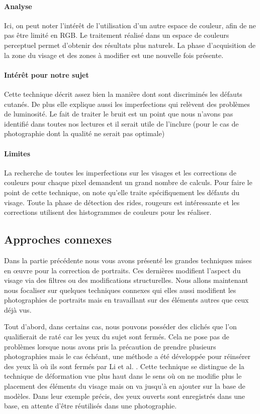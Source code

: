 \documentclass[11pt, french]{report-rd-info}
\begin{document}
\paragraph{Analyse}
Ici, on peut noter l'intérêt de l'utilisation d'un autre espace de couleur, afin de ne pas être limité en RGB. Le traitement réalisé dans un espace de couleurs perceptuel permet d'obtenir des résultats plus naturels. La phase d'acquisition de la zone du visage et des zones à modifier est une nouvelle fois présente.
\paragraph{Intérêt pour notre sujet}
Cette technique décrit assez bien la manière dont sont discriminés les défauts cutanés. De plus elle explique aussi les imperfections qui relèvent des problèmes de luminosité. Le fait de traiter le bruit est un point que nous n’avons pas identifié dans toutes nos lectures et il serait utile de l’inclure (pour le cas de photographie dont la qualité ne serait pas optimale)
\paragraph{Limites}
La recherche de toutes les imperfections sur les visages et les corrections de couleurs pour chaque pixel demandent un grand nombre de calculs.
Pour faire le point de cette technique, on note qu’elle traite spécifiquement les défauts du visage. Toute la phase de détection des rides, rougeurs est intéressante et les corrections utilisent des histogrammes de couleurs pour les réaliser.
\subsection{Approches connexes}
Dans la partie précédente nous vous avons présenté les grandes techniques mises en œuvre pour la correction de portraits. Ces dernières modifient l’aspect du visage via des filtres ou des modifications structurelles. Nous allons maintenant nous focaliser sur quelques techniques connexes qui elles aussi modifient les photographies de portraits mais en travaillant sur des éléments autres que ceux déjà vus.

Tout d’abord, dans certains cas, nous pouvons posséder des clichés que l'on qualifierait de raté car les yeux du sujet sont fermés. Cela ne pose pas de problèmes lorsque nous avons pris la précaution de prendre plusieurs photographies mais le cas échéant, une méthode a été développée pour réinsérer des yeux là où ils sont fermés par Li et al. \cite{Li2011}. Cette technique se distingue de la technique de déformation vue plus haut dans le sens où on ne modifie plus le placement des éléments du visage mais on va jusqu'à en ajouter sur la base de modèles. Dans leur exemple précis, des yeux ouverts sont enregistrés dans une base, en attente d’être réutilisés dans une photographie.
\end{document}
